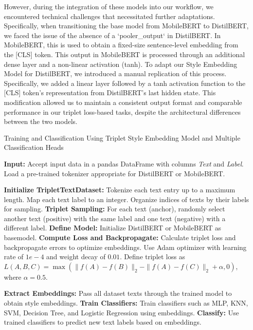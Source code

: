 \documentclass{article}
\begin{document}
However, during the integration of these models into our workflow, we encountered technical challenges that necessitated further adaptations. Specifically, when transitioning the base model from MobileBERT to DistilBERT, we faced the issue of the absence of a `pooler\_output` in DistilBERT. In MobileBERT, this is used to obtain a fixed-size sentence-level embedding from the [CLS] token. This output in MobileBERT is processed through an additional dense layer and a non-linear activation (tanh). To adapt our Style Embedding Model for DistilBERT, we introduced a manual replication of this process. Specifically, we added a linear layer followed by a tanh activation function to the [CLS] token's representation from DistilBERT's last hidden state. This modification allowed us to maintain a consistent output format and comparable performance in our triplet loss-based tasks, despite the architectural differences between the two models.


\begin{algorithm}[H]
\caption{Training and Classification Using Triplet Style Embedding Model and Multiple Classification Heads}
\begin{algorithmic}[1]
\State \textbf{Input:} Accept input data in a pandas DataFrame with columns \textit{Text} and \textit{Label}.
\State Load a pre-trained tokenizer appropriate for DistilBERT or MobileBERT.
\Statex

\State \textbf{Initialize TripletTextDataset:}
\State Tokenize each text entry up to a maximum length.
\State Map each text label to an integer.
\State Organize indices of texts by their labels for sampling.
\State \textbf{Triplet Sampling:} For each text (anchor), randomly select another text (positive) with the same label and one text (negative) with a different label.
\State \textbf{Define Model:} Initialize DistilBERT or MobileBERT as basemodel.
\State \textbf{Compute Loss and Backpropagate:} Calculate triplet loss and backpropagate errors to optimize embeddings. Use Adam optimizer with learning rate of \(1e-4\) and weight decay of \(0.01\). Define triplet loss as \(L(A, B, C) = \max(\|f(A) - f(B)\|_2 - \|f(A) - f(C)\|_2 + \alpha, 0)\), where \(\alpha = 0.5\).
\EndProcedure
\Statex

\State \textbf{Extract Embeddings:} Pass all dataset texts through the trained model to obtain style embeddings.
\State \textbf{Train Classifiers:} Train classifiers such as MLP, KNN, SVM, Decision Tree, and Logistic Regression using embeddings.
\State \textbf{Classify:} Use trained classifiers to predict new text labels based on embeddings.
\EndProcedure

\end{algorithmic}
\end{algorithm}
\end{document}
